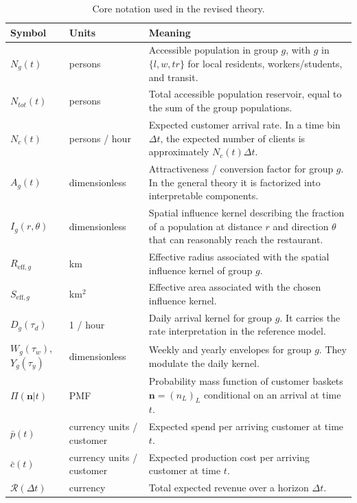 \documentclass{article}
\begin{document}
\begin{table}[H]
\centering
\caption{Core notation used in the revised theory.}
\label{tab:notation}
\begin{tabularx}{\linewidth}{|p{2.5cm}|p{2.7cm}|X|}
\hline
Symbol & Units & Meaning \\
\hline
\( N_g(t) \) & persons & Accessible population in group \( g \), with \( g \) in \( \{l,w,tr\} \) for local residents, workers/students, and transit. \\
\hline
\( N_{tot}(t) \) & persons & Total accessible population reservoir, equal to the sum of the group populations. \\
\hline
\( N_c(t) \) & persons / hour & Expected customer arrival rate. In a time bin \( \Delta t \), the expected number of clients is approximately \( N_c(t) \Delta t \). \\
\hline
\( A_g(t) \) & dimensionless & Attractiveness / conversion factor for group \( g \). In the general theory it is factorized into interpretable components. \\
\hline
\( I_g(r,\theta) \) & dimensionless & Spatial influence kernel describing the fraction of a population at distance \( r \) and direction \( \theta \) that can reasonably reach the restaurant. \\
\hline
\( R_{\mathrm{eff},g} \) & km & Effective radius associated with the spatial influence kernel of group \( g \). \\
\hline
\( S_{\mathrm{eff},g} \) & km\( ^2 \) & Effective area associated with the chosen influence kernel. \\
\hline
\( D_g(\tau_d) \) & 1 / hour & Daily arrival kernel for group \( g \). It carries the rate interpretation in the reference model. \\
\hline
\( W_g(\tau_w) \), \( Y_g(\tau_y) \) & dimensionless & Weekly and yearly envelopes for group \( g \). They modulate the daily kernel. \\
\hline
\( \Pi(\mathbf{n}|t) \) & PMF & Probability mass function of customer baskets \( \mathbf{n} = (n_L)_L \) conditional on an arrival at time \( t \). \\
\hline
\( \bar{p}(t) \) & currency units / customer & Expected spend per arriving customer at time \( t \). \\
\hline
\( \bar{c}(t) \) & currency units / customer & Expected production cost per arriving customer at time \( t \). \\
\hline
\( \mathcal{R}(\Delta t) \) & currency & Total expected revenue over a horizon \( \Delta t \). \\

\end{tabularx}
\end{table}
\end{document}

